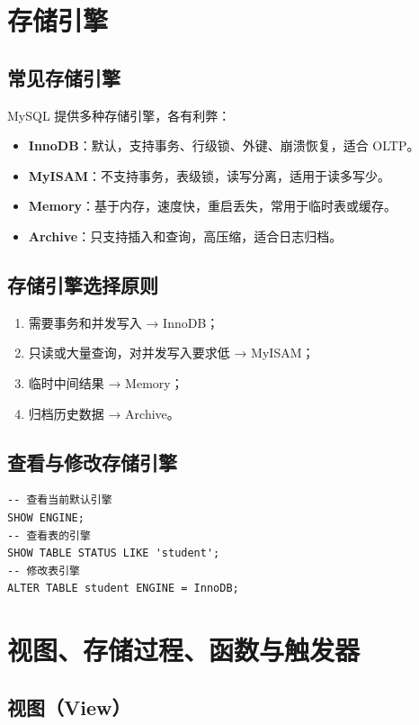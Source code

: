 \documentclass[12pt,UTF8]{ctexbook}
\begin{document}
\chapter{存储引擎}
\label{ch:engine}

\section{常见存储引擎}
MySQL 提供多种存储引擎，各有利弊：
\begin{itemize}
  \item \textbf{InnoDB}：默认，支持事务、行级锁、外键、崩溃恢复，适合 OLTP。
  \item \textbf{MyISAM}：不支持事务，表级锁，读写分离，适用于读多写少。
  \item \textbf{Memory}：基于内存，速度快，重启丢失，常用于临时表或缓存。
  \item \textbf{Archive}：只支持插入和查询，高压缩，适合日志归档。
\end{itemize}

\section{存储引擎选择原则}
\begin{enumerate}
  \item 需要事务和并发写入 → InnoDB；
  \item 只读或大量查询，对并发写入要求低 → MyISAM；
  \item 临时中间结果 → Memory；
  \item 归档历史数据 → Archive。
\end{enumerate}

\section{查看与修改存储引擎}
\begin{lstlisting}
-- 查看当前默认引擎
SHOW ENGINE;
-- 查看表的引擎
SHOW TABLE STATUS LIKE 'student';
-- 修改表引擎
ALTER TABLE student ENGINE = InnoDB;
\end{lstlisting}

\chapter{视图、存储过程、函数与触发器}
\label{ch:advanced}

\section{视图（View）}
\end{document}

